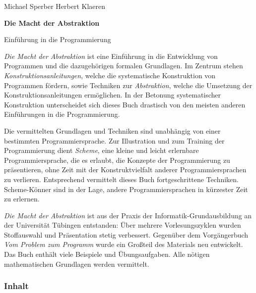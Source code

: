 \documentclass{tueteubner}
\begin{document}
\sffamily

\centerline{\Large Michael Sperber \qquad Herbert Klaeren}

\medskip

\centerline{\textbf{\huge Die Macht der Abstraktion}}

\medskip

\centerline{\Large Einführung in die Programmierung}

\medskip

\textit{Die Macht der Abstraktion} ist eine Einführung in die
Entwicklung von Programmen und die dazugehörigen formalen Grundlagen.
Im Zentrum stehen \textit{Konstruktionsanleitungen}, welche die
systematische Konstruktion von Programmen fördern, sowie Techniken zur
\textit{Abstraktion}, welche die Umsetzung der
Konstruktionsanleitungen ermöglichen.  In der Betonung systematischer
Konstruktion unterscheidet sich dieses Buch drastisch von den meisten
anderen Einführungen in die Programmierung.

Die vermittelten Grundlagen und Techniken sind unabhängig von einer
bestimmten Programmiersprache.  Zur Illustration und zum Training der
Programmierung dient \textit{Scheme}, eine kleine und leicht
erlernbare Programmiersprache, die es erlaubt, die Konzepte der
Programmierung zu präsentieren, ohne Zeit mit der Konstruktvielfalt
anderer Programmiersprachen zu verlieren.  Entsprechend vermittelt
dieses Buch fortgeschrittene Techniken.  Scheme-Könner sind in der
Lage, andere Programmiersprachen in kürzester Zeit zu erlernen.

\textit{Die Macht der Abstraktion} ist aus der Praxis der
Informatik-Grundausbildung an der Universität Tübingen entstanden:
Über mehrere Vorlesungszyklen wurden Stoffauswahl und Präsentation
stetig verbessert.  Gegenüber dem Vorgängerbuch \textit{Vom
  Problem zum Programm} wurde ein Großteil des Materials neu
entwickelt.  Das Buch enthält viele
Beispiele und Übungsaufgaben.  Alle nötigen mathematischen
Grundlagen werden vermittelt.

\subsubsection*{Inhalt}~

\vspace*{-0.5ex}

\setlength\itemsep{-4pt}
\medskip
\end{document}
